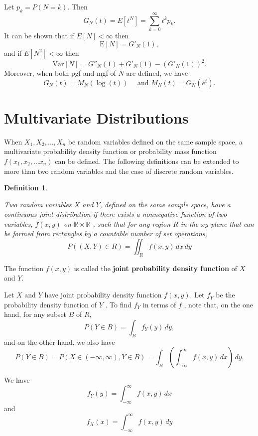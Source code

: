 \documentclass[landscape, 20pt]{extreport}
\theoremstyle{definition}
\newtheorem{definition}{Definition}[chapter]
\theoremstyle{definition}
\theoremstyle{definition}
\theoremstyle{definition}
\theoremstyle{remark}
\begin{document}
Let \(p_k = P(N = k)\). Then
\[G_N(t) = E[t^N] = \sum_{k=0}^\infty t^k p_k.\] It can be shown that if
\(E[N] < \infty\) then \[\mathrm{E}[N] = G'_N(1),\] and if
\(E[N^2] < \infty\) then
\[\mathrm{Var}[N] = G''_N(1) + G'_N(1) - (G'_N(1))^2.\] Moreover, when
both pgf and mgf of \(N\) are defined, we have
\[G_N(t) = M_N(\log(t)) \quad \text{ and } M_N(t) = G_N(e^t).\]

\hypertarget{multivariate-distributions}{%
\section{Multivariate Distributions}\label{multivariate-distributions}}

When \(X_1,X_2,\ldots ,X_n\) be random variables defined on the same
sample space, a multivariate probability density function or probability
mass function\\
\(f(x_1, x_2, \ldots x_n)\) can be defined. The following definitions can
be extended to more than two random variables and the case of discrete
random variables.

\begin{definition}
\protect\hypertarget{def:unlabeled-div-18}{}\label{def:unlabeled-div-18}

\emph{Two random variables \(X\) and \(Y\), defined on the
same sample space, have a continuous joint distribution if there exists
a nonnegative function of two variables, \(f(x, y)\) on
\(\mathbb{R} \times \mathbb{R}\) , such that for any region \(R\) in the
\(xy\)-plane that can be formed from rectangles by a countable number of
set operations, \[P((X, Y)  \in R) = \iint_R f(x,y) \, dx\, dy\] }

\end{definition}

The function \(f (x, y)\) is called the \textbf{joint probability density
function} of \(X\) and \(Y\).

Let \(X\) and \(Y\) have joint probability density function \(f (x, y)\). Let
\(f_Y\) be the probability density function of \(Y\) . To find \(f_Y\) in
terms of \(f\) , note that, on the one hand, for any subset \(B\) of \(R\),
\[P(Y \in B) = \int_B f_Y(y) \, dy,\] and on the other hand, we also
have
\[P(Y \in B) = P(X \in (-\infty, \infty), Y \in B) = \int_B \left(    \int_{-\infty}^\infty f(x,y)\, dx  \right) \, dy.\]

We have
\begin{equation} 
\label{eq:label} f_Y(y) =   \int_{-\infty}^\infty f(x,y)\, dx
\end{equation}
and
\begin{equation} 
\label{eq:label2}  f_X(x) =   \int_{-\infty}^\infty f(x,y)\, dy
\end{equation}
\end{document}
